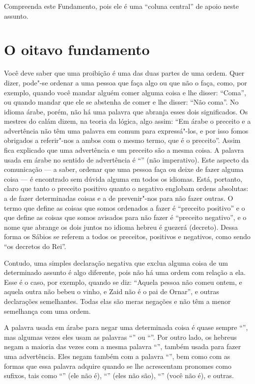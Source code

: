 Compreenda este Fundamento, pois ele é uma ``coluna central'' de apoio
neste assunto.


\chapter*{O oitavo fundamento}

Você deve saber que uma proibição é uma das duas partes de uma ordem.
Quer dizer, pode"-se ordenar a uma pessoa que faça algo ou que não o
faça, como, por exemplo, quando você mandar alguém comer alguma coisa e
lhe disser: ``Coma'', ou quando mandar que ele se abstenha de comer e
lhe disser: ``Não coma''. No idioma árabe, porém, não há uma palavra que
abranja esses dois significados. Os mestres do calám\starr{} dizem, na teoria da
lógica, algo assim: ``Em árabe o preceito e a advertência não têm uma
palavra em comum para expressá"-los, e por isso fomos obrigados a
referir"-nos a ambos com o mesmo termo, que é o preceito''. Assim fica
explicado que uma advertência e um preceito são a mesma coisa. A palavra
usada em árabe no sentido de advertência é ``'' (não imperativo).
Este aspecto da comunicação --- a saber, ordenar que uma pessoa faça ou
deixe de fazer alguma coisa --- é encontrado sem dúvida alguma em todos
os idiomas. Está, portanto, claro que tanto o preceito positivo quanto
o negativo englobam ordens absolutas: a de fazer determinadas coisas e
a de prevenir"-nos para não fazer outras. O termo que define as coisas
que somos ordenados a fazer é ``preceito positivo'' e o que define as
coisas que somos avisados para não fazer é ``preceito negativo'', e o
nome que abrange os dois juntos no idioma hebreu é guezerá\starr{}
(decreto). Dessa forma os Sábios se referem a todos os preceitos,
positivos e negativos, como sendo ``os decretos do Rei''.

Contudo, uma simples declaração negativa que exclua alguma coisa de um
determinado assunto é algo diferente, pois não há uma ordem com relação
a ela. Esse é o caso, por exemplo, quando se diz: ``Aquela pessoa não
comeu ontem, e aquela outra não bebeu o vinho, e Zaid não é o pai de
Ornar'', e outras declarações semelhantes. Todas elas são meras negações
e não têm a menor semelhança com uma ordem.

A palavra usada em árabe para negar uma determinada coisa é quase sempre
``'', mas algumas vezes eles usam as palavras ``'' ou ``''. Por
outro lado, os hebreus negam a maioria das vezes com a mesma palavra
``'', também usada para fazer uma advertência. Eles negam também com a
palavra ``'', bem como com as formas que essa palavra adquire quando
se lhe acrescentam pronomes como sufixos, tais como ``'' (ele não
é), ``'' (eles não são), ``'' (você não é), e outras.

